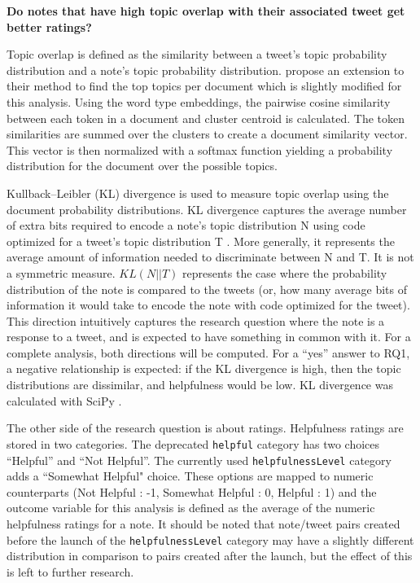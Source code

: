 \documentclass [11pt, proquest] {uwthesis}[2020/02/24]
\begin{document}
\textbf{Do notes that have high topic overlap with their associated tweet get better ratings?
}


Topic overlap is defined as the similarity between a tweet’s topic probability distribution and a note’s topic probability distribution. \cite{sia-etal-2020-tired} propose an extension to their method to find the top topics per document which is slightly modified for this analysis. Using the word type embeddings,  the pairwise cosine similarity between each token in a document and cluster centroid is calculated. The token similarities are summed over the clusters to create a document similarity vector. This vector is then normalized with a softmax function yielding a probability distribution for the document over the possible topics.

Kullback–Leibler (KL) divergence is used to measure topic overlap using the document probability distributions. KL divergence captures the average number of extra bits required to encode a note’s topic distribution N using code optimized for a tweet’s topic distribution T \citep{Murphy2012}. More generally, it represents the average amount of information needed to discriminate between N and T. It is not a symmetric measure. $KL(N || T)$ represents the case where the probability distribution of the note is compared to the tweets (or, how many average bits of information it would take to encode the note with code optimized for the tweet). This direction intuitively captures the research question where the note is a response to a tweet, and is expected to have something in common with it. For a complete analysis, both directions will be computed. For a “yes” answer to RQ1, a negative relationship is expected: if the KL divergence is high, then the topic distributions are dissimilar, and helpfulness would be low. KL divergence was calculated with SciPy \citep{2020SciPy-NMeth}.

The other side of the research question is about ratings. Helpfulness ratings are stored in two categories. The deprecated \verb|helpful| category has two choices “Helpful” and “Not Helpful”. The currently used \verb|helpfulnessLevel| category adds a ``Somewhat Helpful" choice. These options are mapped to numeric counterparts (Not Helpful : -1, Somewhat Helpful : 0, Helpful : 1) and the outcome variable for this analysis is defined as the average of the numeric helpfulness ratings for a note. It should be noted that note/tweet pairs created before the launch of the \verb|helpfulnessLevel| category may have a slightly different distribution in comparison to pairs created after the launch, but the effect of this is left to further research.
\end{document}
